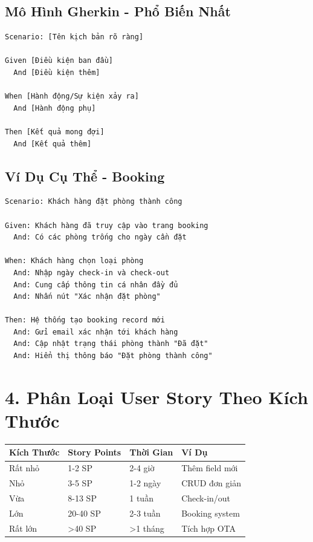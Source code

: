 \documentclass[12pt, a4paper]{report}
\begin{document}
\subsection{Mô Hình Gherkin - Phổ Biến Nhất}

\begin{tcolorbox}[colback=cyan!5, colframe=cyan!50]
\begin{lstlisting}
Scenario: [Tên kịch bản rõ ràng]

Given [Điều kiện ban đầu]
  And [Điều kiện thêm]
  
When [Hành động/Sự kiện xảy ra]
  And [Hành động phụ]
  
Then [Kết quả mong đợi]
  And [Kết quả thêm]
\end{lstlisting}
\end{tcolorbox}

\subsection{Ví Dụ Cụ Thể - Booking}

\begin{tcolorbox}[colback=yellow!5, colframe=yellow!50]
\begin{lstlisting}
Scenario: Khách hàng đặt phòng thành công

Given: Khách hàng đã truy cập vào trang booking
  And: Có các phòng trống cho ngày cần đặt
  
When: Khách hàng chọn loại phòng
  And: Nhập ngày check-in và check-out
  And: Cung cấp thông tin cá nhân đầy đủ
  And: Nhấn nút "Xác nhận đặt phòng"
  
Then: Hệ thống tạo booking record mới
  And: Gửi email xác nhận tới khách hàng
  And: Cập nhật trạng thái phòng thành "Đã đặt"
  And: Hiển thị thông báo "Đặt phòng thành công"
\end{lstlisting}
\end{tcolorbox}

\newpage

\section{4. Phân Loại User Story Theo Kích Thước}

\begin{table}[h]
\centering
\begin{tabular}{|l|p{3cm}|p{3cm}|p{3cm}|}
\hline
\textbf{Kích Thước} & \textbf{Story Points} & \textbf{Thời Gian} & \textbf{Ví Dụ} \\
\hline
Rất nhỏ & 1-2 SP & 2-4 giờ & Thêm field mới \\
\hline
Nhỏ & 3-5 SP & 1-2 ngày & CRUD đơn giản \\
\hline
Vừa & 8-13 SP & 1 tuần & Check-in/out \\
\hline
Lớn & 20-40 SP & 2-3 tuần & Booking system \\
\hline
Rất lớn & >40 SP & >1 tháng & Tích hợp OTA \\
\hline
\end{tabular}
\end{table}
\end{document}
